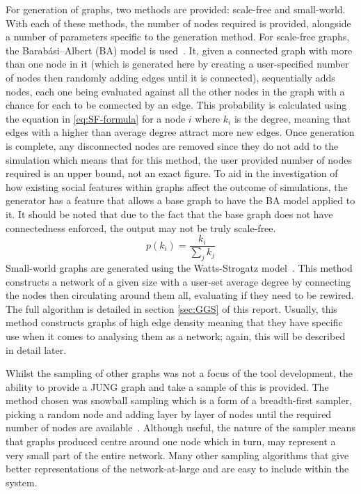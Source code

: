 \documentclass[]{report}
\begin{document}
For generation of graphs, two methods are provided: scale-free and small-world. With each of these methods, the number of nodes required is provided, alongside a number of parameters specific to the generation method. For scale-free graphs, the Barabási–Albert (BA) model is used~\cite{BAStat}. It, given a connected graph with more than one node in it (which is generated here by creating a user-specified number of nodes then randomly adding edges until it is connected), sequentially adds nodes, each one being evaluated against all the other nodes in the graph with a chance for each to be connected by an edge. This probability is calculated using the equation in \ref{eq:SF-formula} for a node $i$ where $k_{i}$ is the degree, meaning that edges with a higher than average degree attract more new edges. Once generation is complete, any disconnected nodes are removed since they do not add to the simulation which means that for this method, the user provided number of nodes required is an upper bound, not an exact figure. To aid in the investigation of how existing social features within graphs affect the outcome of simulations, the generator has a feature that allows a base graph to have the BA model applied to it. It should be noted that due to the fact that the base graph does not have connectedness enforced, the output may not be truly scale-free. 
\begin{equation}
\label{eq:SF-formula}
p(k_{i}) = \frac{k_{i}}{\sum\limits_{j}k_{j}}
\end{equation}
Small-world graphs are generated using the Watts-Strogatz model~\cite{BAStat}. This method constructs a network of a given size with a user-set average degree by connecting the nodes then circulating around them all, evaluating if they need to be rewired. The full algorithm is detailed in section \ref{sec:GGS} of this report. Usually, this method constructs graphs of high edge density meaning that they have specific use when it comes to analysing them as a network; again, this will be described in detail later.

Whilst the sampling of other graphs was not a focus of the tool development, the ability to provide a JUNG graph and take a sample of this is provided. The method chosen was snowball sampling which is a form of a breadth-first sampler, picking a random node and adding layer by layer of nodes until the required number of nodes are available~\cite{snowball}. Although useful, the nature of the sampler means that graphs produced centre around one node which in turn, may represent a very small part of the entire network. Many other sampling algorithms that give better representations of the network-at-large and are easy to include within the system.
\end{document}
